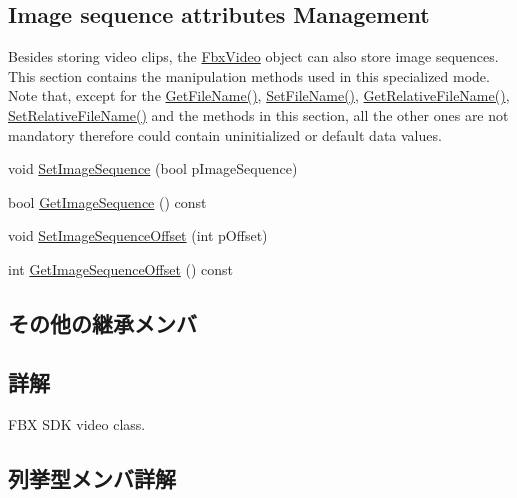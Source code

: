 \subsection*{Image sequence attributes Management}
\label{_amgrp3cc586aa3ad85d11fb9e89277ee745d9}%
Besides storing video clips, the \hyperlink{class_fbx_video}{Fbx\+Video} object can also store image sequences. This section contains the manipulation methods used in this specialized mode. Note that, except for the \hyperlink{class_fbx_video_a96fc2a11e4e7ca89230389bb55ca5466}{Get\+File\+Name()}, \hyperlink{class_fbx_video_a897a450c62670d4730cb9ee663a26ea2}{Set\+File\+Name()}, \hyperlink{class_fbx_video_a5c99c225a47e6aae4cd3028f2737babb}{Get\+Relative\+File\+Name()}, \hyperlink{class_fbx_video_a3217bac3585954766fa2c56a10de48f3}{Set\+Relative\+File\+Name()} and the methods in this section, all the other ones are not mandatory therefore could contain uninitialized or default data values. \begin{DoxyCompactItemize}
\item 
void \hyperlink{class_fbx_video_a511c7cfc220c659c6d07cb4b891572ae}{Set\+Image\+Sequence} (bool p\+Image\+Sequence)
\item 
bool \hyperlink{class_fbx_video_aefb54b6ccb813ae4da9062b27db5fb1f}{Get\+Image\+Sequence} () const
\item 
void \hyperlink{class_fbx_video_a32c2bbbd3fdcfc4d653e14067d92e552}{Set\+Image\+Sequence\+Offset} (int p\+Offset)
\item 
int \hyperlink{class_fbx_video_a9b37e1a2972b4cf0016ad94d86ea5680}{Get\+Image\+Sequence\+Offset} () const
\end{DoxyCompactItemize}
\subsection*{その他の継承メンバ}


\subsection{詳解}
F\+BX S\+DK video class. 

\subsection{列挙型メンバ詳解}
\mbox{\label{class_fbx_video_a6dd88dabb2170adcd8c58952ed2e0c40}} 
